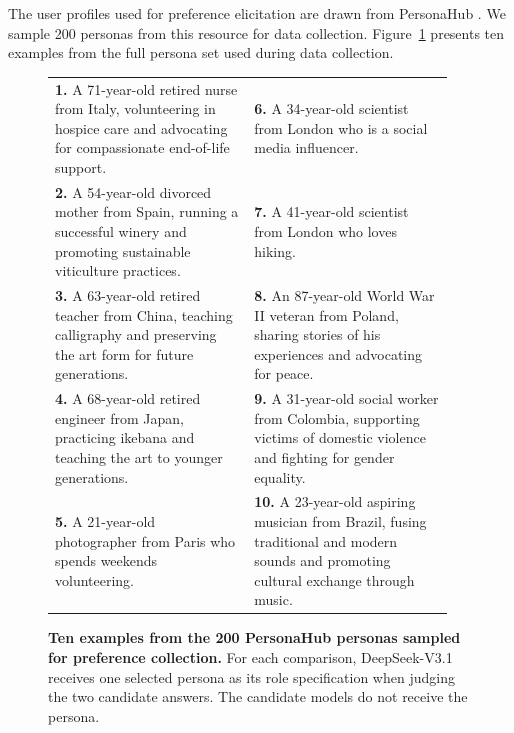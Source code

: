 The user profiles used for preference elicitation are drawn from PersonaHub \citep{tencent2024personahub}. We sample 200 personas from this resource for data collection. Figure~\ref{fig:personahub_personas} presents ten examples from the full persona set used during data collection.

\begin{figure}[H]
\centering
\begin{minipage}{0.98\linewidth}
\begin{mybox}
\footnotesize
\begin{tabular}{@{}p{0.47\linewidth}@{\hspace{0.03\linewidth}}p{0.47\linewidth}@{}}
\textbf{1.} A 71-year-old retired nurse from Italy, volunteering in hospice care and advocating for compassionate end-of-life support. & \textbf{6.} A 34-year-old scientist from London who is a social media influencer. \\
\textbf{2.} A 54-year-old divorced mother from Spain, running a successful winery and promoting sustainable viticulture practices. & \textbf{7.} A 41-year-old scientist from London who loves hiking. \\
\textbf{3.} A 63-year-old retired teacher from China, teaching calligraphy and preserving the art form for future generations. & \textbf{8.} An 87-year-old World War II veteran from Poland, sharing stories of his experiences and advocating for peace. \\
\textbf{4.} A 68-year-old retired engineer from Japan, practicing ikebana and teaching the art to younger generations. & \textbf{9.} A 31-year-old social worker from Colombia, supporting victims of domestic violence and fighting for gender equality. \\
\textbf{5.} A 21-year-old photographer from Paris who spends weekends volunteering. & \textbf{10.} A 23-year-old aspiring musician from Brazil, fusing traditional and modern sounds and promoting cultural exchange through music. \\
\end{tabular}
\end{mybox}
\end{minipage}
\caption{\textbf{Ten examples from the 200 PersonaHub personas sampled for preference collection.} For each comparison, DeepSeek-V3.1 receives one selected persona as its role specification when judging the two candidate answers. The candidate models do not receive the persona.}
\label{fig:personahub_personas}
\end{figure}

